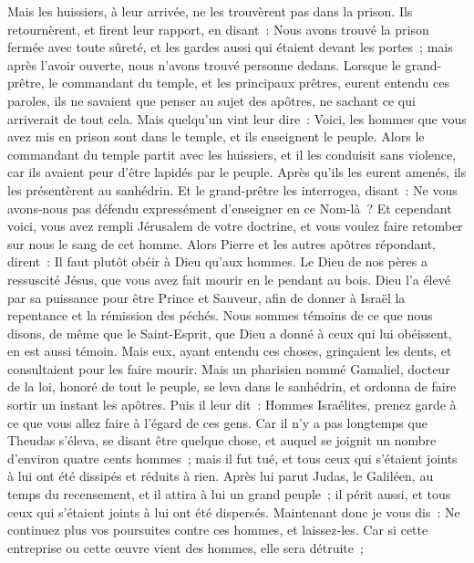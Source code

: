 \begin{multicols}{2}
Mais les huissiers, à leur arrivée, ne les trouvèrent pas dans la prison. Ils retournèrent, et firent leur rapport,
en disant~: Nous avons trouvé la prison fermée avec toute sûreté, et les gardes aussi qui étaient devant les portes~; mais après l'avoir ouverte, nous n'avons trouvé personne dedans.
Lorsque le grand-prêtre, le commandant du temple, et les principaux prêtres, eurent entendu ces paroles, ils ne savaient que penser au sujet des apôtres, ne sachant ce qui arriverait de tout cela.
Mais quelqu'un vint leur dire~: Voici, les hommes que vous avez mis en prison sont dans le temple, et ils enseignent le peuple.
Alors le commandant du temple partit avec les huissiers, et il les conduisit sans violence, car ils avaient peur d'être lapidés par le peuple.
Après qu'ils les eurent amenés, ils les présentèrent au sanhédrin. Et le grand-prêtre les interrogea, disant~: 
Ne vous avons-nous pas défendu expressément d'enseigner en ce Nom-là~? Et cependant voici, vous avez rempli Jérusalem de votre doctrine, et vous voulez faire retomber sur nous le sang de cet homme.
Alors Pierre et les autres apôtres répondant, dirent~: Il faut plutôt obéir à Dieu qu'aux hommes.
Le Dieu de nos pères a ressuscité Jésus, que vous avez fait mourir en le pendant au bois.
Dieu l'a élevé par sa puissance pour être Prince et Sauveur, afin de donner à Israël la repentance et la rémission des péchés.
Nous sommes témoins de ce que nous disons, de même que le Saint-Esprit, que Dieu a donné à ceux qui lui obéissent, en est aussi témoin.
Mais eux, ayant entendu ces choses, grinçaient les dents, et consultaient pour les faire mourir.
Mais un pharisien nommé Gamaliel, docteur de la loi, honoré de tout le peuple, se leva dans le sanhédrin, et ordonna de faire sortir un instant les apôtres.
Puis il leur dit~: Hommes Israélites, prenez garde à ce que vous allez faire à l'égard de ces gens.
Car il n'y a pas longtemps que Theudas s'éleva, se disant être quelque chose, et auquel se joignit un nombre d'environ quatre cents hommes~; mais il fut tué, et tous ceux qui s'étaient joints à lui ont été dissipés et réduits à rien.
Après lui parut Judas, le Galiléen, au temps du recensement, et il attira à lui un grand peuple~; il périt aussi, et tous ceux qui s'étaient joints à lui ont été dispersés.
Maintenant donc je vous dis~: Ne continuez plus vos poursuites contre ces hommes, et laissez-les. Car si cette entreprise ou cette œuvre vient des hommes, elle sera détruite~;

\end{multicols}
